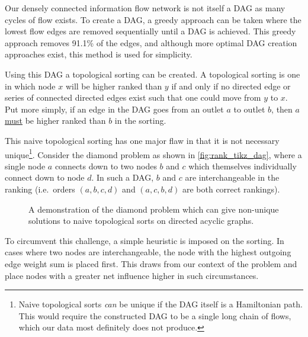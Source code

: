 Our densely connected information flow network is not itself a DAG as many cycles of flow exists. To create a DAG, a greedy approach can be taken where the lowest flow edges are removed sequentially until a DAG is achieved. This greedy approach removes 91.1\% of the edges, and although more optimal DAG creation approaches exist, this method is used for simplicity. 

Using this DAG a topological sorting can be created. A topological sorting is one in which node $x$ will be higher ranked than $y$ if and only if no directed edge or series of connected directed edges exist such that one could move from $y$ to $x$. Put more simply, if an edge in the DAG goes from an outlet $a$ to outlet $b$, then $a$ \underline{must} be higher ranked than $b$ in the sorting.

This naive topological sorting has one major flaw in that it is not necessary unique\footnote{Naive topological sorts \emph{can} be unique if the DAG itself is a Hamiltonian path. This would require the constructed DAG to be a single long chain of flows, which our data most definitely does not produce.}. Consider the diamond problem as shown in \autoref{fig:rank_tikz_dag}, where a single node $a$ connects down to two nodes $b$ and $c$ which themselves individually connect down to node $d$. In such a DAG, $b$ and $c$ are interchangeable in the ranking (i.e.\ orders $(a,b,c,d)$ and $(a,c,b,d)$ are both correct rankings).

\begin{figure}[!htbp]
\centering
{}
\caption{A demonstration of the diamond problem which can give non-unique solutions to naive topological sorts on directed acyclic graphs.}\label{fig:rank_tikz_dag}
\end{figure}

To circumvent this challenge, a simple heuristic is imposed on the sorting. In cases where two nodes are interchangeable, the node with the highest outgoing edge weight sum is placed first. This draws from our context of the problem and place nodes with a greater net influence higher in such circumstances.

